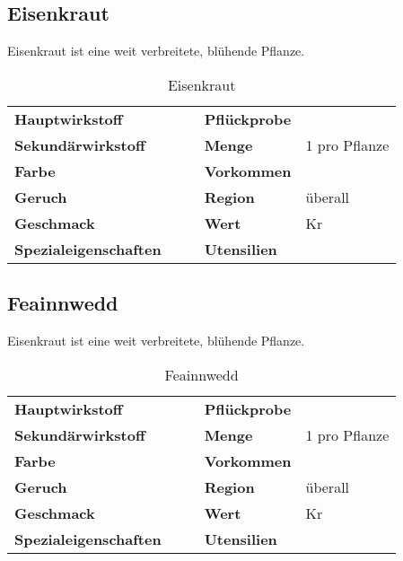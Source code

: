 \subsection{Eisenkraut}
Eisenkraut ist eine weit verbreitete, blühende Pflanze. 

\begin{table}[h]
\begin{center}
\begin{tabular}{|l|l|p{1cm}|l|l|}
	\cline{1-2} \cline{4-5}
	\textbf{Hauptwirkstoff} &  && \textbf{Pflückprobe} &  \\ \cline{1-2} \cline{4-5}
	\textbf{Sekundärwirkstoff} &  && \textbf{Menge} & 1 pro Pflanze \\ \cline{1-2} \cline{4-5}
	\textbf{Farbe} &  && \textbf{Vorkommen} &  \\ \cline{1-2} \cline{4-5}
	\textbf{Geruch} &  && \textbf{Region} & überall \\ \cline{1-2} \cline{4-5}
	\textbf{Geschmack} &  && \textbf{Wert} & Kr \\ \cline{1-2} \cline{4-5}
	\textbf{Spezialeigenschaften} &  && \textbf{Utensilien} &  \\ \cline{1-2} \cline{4-5}
\end{tabular}
\end{center}
\caption{Eisenkraut}
\label{tab:eisenkraut}
\end{table}


\subsection{Feainnwedd}
Eisenkraut ist eine weit verbreitete, blühende Pflanze. 

\begin{table}[h]
\begin{center}
\begin{tabular}{|l|l|p{1cm}|l|l|}
	\cline{1-2} \cline{4-5}
	\textbf{Hauptwirkstoff} &  && \textbf{Pflückprobe} &  \\ \cline{1-2} \cline{4-5}
	\textbf{Sekundärwirkstoff} &  && \textbf{Menge} & 1 pro Pflanze \\ \cline{1-2} \cline{4-5}
	\textbf{Farbe} &  && \textbf{Vorkommen} &  \\ \cline{1-2} \cline{4-5}
	\textbf{Geruch} &  && \textbf{Region} & überall \\ \cline{1-2} \cline{4-5}
	\textbf{Geschmack} &  && \textbf{Wert} & Kr \\ \cline{1-2} \cline{4-5}
	\textbf{Spezialeigenschaften} &  && \textbf{Utensilien} &  \\ \cline{1-2} \cline{4-5}
\end{tabular}
\end{center}
\caption{Feainnwedd}
\label{tab:feainnwedd}
\end{table}


